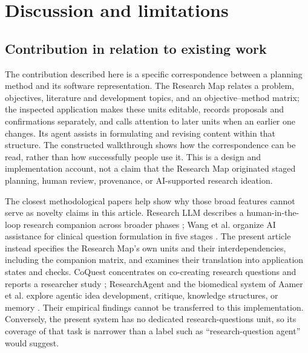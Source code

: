 \section{Discussion and limitations}
\label{sec:discussion}

\subsection{Contribution in relation to existing work}

The contribution described here is a specific correspondence between a planning method and its software representation. The Research Map relates a problem, objectives, literature and development topics, and an objective--method matrix; the inspected application makes these units editable, records proposals and confirmations separately, and calls attention to later units when an earlier one changes. Its agent assists in formulating and revising content within that structure. The constructed walkthrough shows how the correspondence can be read, rather than how successfully people use it. This is a design and implementation account, not a claim that the Research Map originated staged planning, human review, provenance, or AI-supported research ideation.

The closest methodological papers help show why those broad features cannot serve as novelty claims in this article. Research LLM describes a human-in-the-loop research companion across broader phases \cite{guerard2026researchllm}; Wang et al. organize AI assistance for clinical question formulation in five stages \cite{wang2026fivestage}. The present article instead specifies the Research Map's own units and their interdependencies, including the companion matrix, and examines their translation into application states and checks. CoQuest concentrates on co-creating research questions and reports a researcher study \cite{liu2024coquest}; ResearchAgent and the biomedical system of Aamer et al. explore agentic idea development, critique, knowledge structures, or memory \cite{baek2025researchagent,aamer2026biomedical}. Their empirical findings cannot be transferred to this implementation. Conversely, the present system has no dedicated research-questions unit, so its coverage of that task is narrower than a label such as ``research-question agent'' would suggest.


